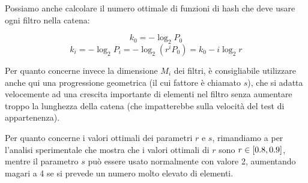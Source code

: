 Possiamo anche calcolare il numero ottimale di funzioni di hash che deve usare ogni filtro nella
catena:

$$ k_0 = -\log_2{P_0} $$
$$ k_i = -\log_2{P_i} = -\log_2{(r^iP_0)} = k_0 - i \log_2{r} $$

Per quanto concerne invece la dimensione $M_i$ dei filtri, è consigliabile utilizzare anche qui
una progressione geometrica (il cui fattore è chiamato $s$), che si adatta velocemente ad una
crescita importante di elementi nel filtro senza aumentare troppo la lunghezza della catena (che
impatterebbe sulla velocità del test di appartenenza). 

Per quanto concerne i valori ottimali dei parametri $r$ e $s$, rimandiamo a \cite{bloom-scalable} per
l'analisi sperimentale che mostra che i valori ottimali di $r$ sono $r \in \interval{0.8}{0.9}$,
mentre il parametro $s$ può essere usato normalmente con valore \num{2}, aumentando magari a \num{4}
se si prevede un numero molto elevato di elementi.


